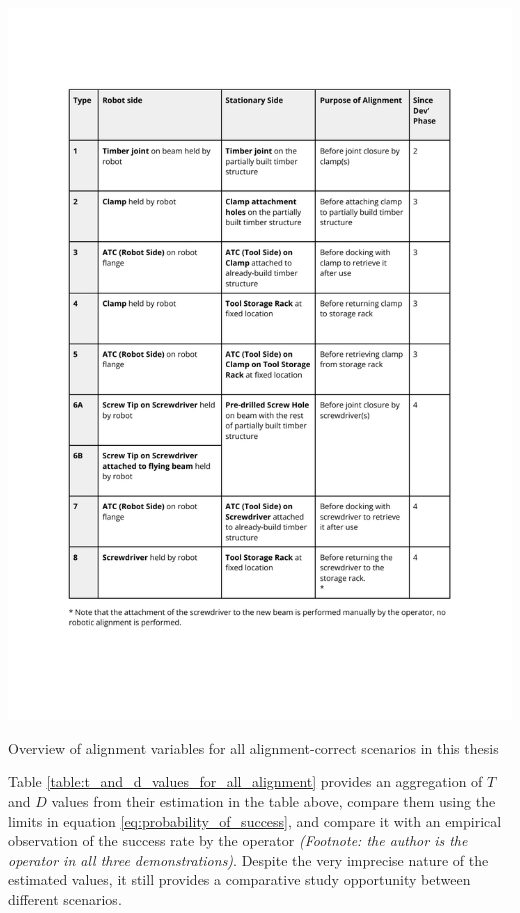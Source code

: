 \begin{table}
    \includegraphics[page=7, trim=25.4mm 40mm 14mm 33mm, clip, width=\textwidth]{tables/Tables in Chapter 9 to 11.pdf}
    \caption{Overview of alignment variables for all alignment-correct scenarios in this thesis}
    \label{table:overview_of_alignment_variables_for_all_alignment}
\end{table}

Table \ref{table:t_and_d_values_for_all_alignment} provides an aggregation of $T$ and $D$ values from their estimation in the table above, compare them using the limits in equation \ref{eq:probability_of_success}, and compare it with an empirical observation of the success rate by the operator \textit{(Footnote: the author is the operator in all three demonstrations)}. Despite the very imprecise nature of the estimated values, it still provides a comparative study opportunity between different scenarios.

